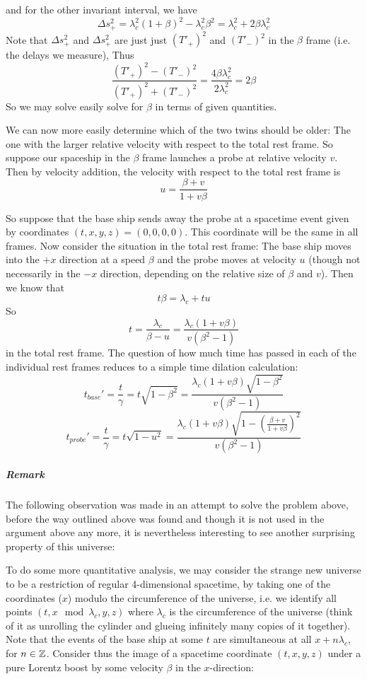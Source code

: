 and for the other invariant interval, we have 
\[ \Delta s_+^2 = \lambda_c^2(1+\beta)^2 - \lambda_c^2\beta^2 = \lambda_c^2 + 2\beta\lambda_c^2 \]
Note that $\Delta s_+^2$ and $\Delta s_+^2$ are just just $(T'_+)^2$ and $(T'_-)^2$ in the $\beta$ frame (i.e. the delays we measure), Thus
\[ \frac{(T'_+)^2 - (T'_-)^2}{(T'_+)^2 + (T'_-)^2} = \frac{4\beta\lambda_c^2}{2\lambda_c^2} = 2\beta \]
So we may solve easily solve for $\beta$ in terms of given quantities. \par 
We can now more easily determine which of the two twins should be older: The one with the larger relative velocity with respect to the total rest frame.
So suppose our spaceship in the $\beta$ frame launches a probe at relative velocity $v$. Then by velocity addition, the velocity with respect to the total rest frame is
\[ u=\frac{\beta+v}{1+v\beta} \]
 \par 
 So suppose that the base ship sends away the probe at a spacetime event given by coordinates
 $(t,x,y,z) = (0,0,0,0)$. This coordinate will be the same in all frames. Now consider the situation in the total rest frame: The base ship moves into the $+x$ direction at a speed $\beta$ and the probe moves at velocity $u$ (though not necessarily in the $-x$ direction, depending on the relative size of $\beta$ and $v$). Then we know that
 \[ t\beta = \lambda_c + tu \]
 So 
 \[ t = \frac{\lambda_c}{\beta - u} = \frac{\lambda_c (1+v\beta)}{v(\beta^2-1)}\]
 in the total rest frame. The question of how much time has passed in each of the individual rest frames reduces to a simple time dilation calculation:
 \[ t_{base}' = \frac{t}{\gamma} = t\sqrt{1-\beta^2} = \frac{\lambda_c (1+v\beta) \sqrt{1-\beta^2}}{v(\beta^2-1)} \]
\[ t_{probe}' = \frac{t}{\gamma} = t\sqrt{1-u^2}
= \frac{\lambda_c (1+v\beta) \sqrt{1-\left(\frac{\beta+v}{1+v\beta}\right)^2}}{v(\beta^2-1)} \]
\subparagraph{Remark}
The following observation was made in an attempt to solve the problem above, before the way outlined above was found and though it is not used in the argument above any more, it is nevertheless interesting to see another surprising property of this universe:\par
To do some more quantitative analysis, we may consider the strange new universe to be a restriction of regular 4-dimensional spacetime,  by taking one of the coordinates ($x$) modulo the circumference of the universe, i.e. we identify all points $(t,x \mod \lambda_c ,y,z)$ where $\lambda_c$ is the circumference of the universe (think of it as unrolling the cylinder and glueing infinitely many copies of it together). Note that the events of the base ship at some $t$ are simultaneous at all $x+n\lambda_c$, for $n\in \mathbb{Z}$. Consider thus the image of a spacetime coordinate $(t, x, y, z)$ under a pure Lorentz boost by some velocity $\beta$ in the $x$-direction:
